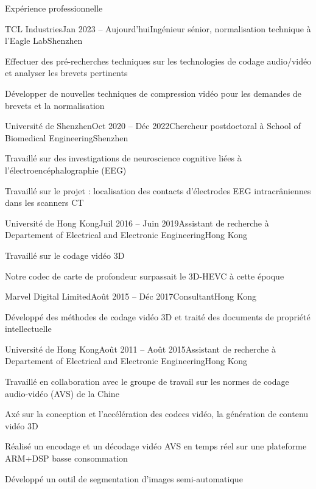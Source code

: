 \documentclass{resume} %
\begin{document}
\begin{rSection}{Expérience professionnelle}
	\begin{rSubsection}{TCL Industries}{Jan 2023 -- Aujourd'hui}{Ingénieur sénior, normalisation technique à l'Eagle Lab}{Shenzhen}
		\item Effectuer des pré-recherches techniques sur les technologies de codage audio/vidéo et analyser les brevets pertinents
		\item Développer de nouvelles techniques de compression vidéo pour les demandes de brevets et la normalisation
	\end{rSubsection}
	
	\begin{rSubsection}{Université de Shenzhen}{Oct 2020 -- Déc 2022}{Chercheur postdoctoral à School of Biomedical Engineering}{Shenzhen}
		\item Travaillé sur des investigations de neuroscience cognitive liées à l'électroencéphalographie (EEG)
		\item Travaillé sur le projet : localisation des contacts d'électrodes EEG intracrâniennes dans les scanners CT
	\end{rSubsection}
	
	\begin{rSubsection}{Université de Hong Kong}{Juil 2016 -- Juin 2019}{Assistant de recherche à Departement of Electrical and Electronic Engineering}{Hong Kong}
		\item Travaillé sur le codage vidéo 3D
		\item Notre codec de carte de profondeur surpassait le 3D-HEVC à cette époque
	\end{rSubsection}
	
	\begin{rSubsection}{Marvel Digital Limited}{Août 2015 -- Déc 2017}{Consultant}{Hong Kong}
		\item Développé des méthodes de codage vidéo 3D et traité des documents de propriété intellectuelle 
	\end{rSubsection}
	
	\begin{rSubsection}{Université de Hong Kong}{Août 2011 -- Août 2015}{Assistant de recherche à Departement of Electrical and Electronic Engineering}{Hong Kong}
		\item Travaillé en collaboration avec le groupe de travail sur les normes de codage audio-vidéo (AVS) de la Chine
		\item Axé sur la conception et l'accélération des codecs vidéo, la génération de contenu vidéo 3D
		\item Réalisé un encodage et un décodage vidéo AVS en temps réel sur une plateforme ARM+DSP basse consommation
		\item Développé un outil de segmentation d'images semi-automatique
	\end{rSubsection}
	

\end{rSection}
\end{document}
